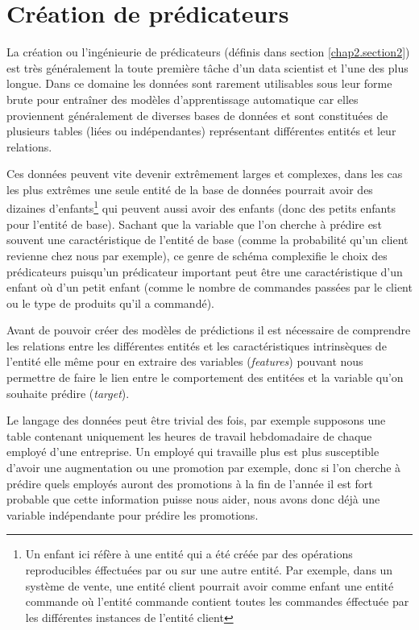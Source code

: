 \section{Création de prédicateurs}
\label{chap3.section1}
La création ou l'ingénieurie de prédicateurs (définis dans section \ref{chap2.section2}) est très généralement la toute première tâche d'un data scientist et l'une des plus longue. Dans ce domaine les données sont rarement utilisables sous leur forme brute pour entraîner des modèles d'apprentissage automatique car elles proviennent généralement de diverses bases de données et sont constituées de plusieurs tables (liées ou indépendantes) représentant différentes entités et leur relations. 

Ces données peuvent vite devenir extrêmement larges et complexes, dans les cas les plus
extrêmes une seule entité de la base de données pourrait avoir des dizaines d’enfants\footnote{Un enfant ici réfère à une entité qui a été créée par des opérations reproducibles éffectuées par ou sur une autre entité. Par exemple, dans un système de vente, une entité client pourrait avoir comme enfant une entité commande où l'entité commande contient toutes les commandes éffectuée par les différentes instances de l'entité client} qui
peuvent aussi avoir des enfants (donc des petits enfants pour l'entité de base). Sachant que la variable que l'on cherche à prédire est souvent une caractéristique de l'entité de base (comme la probabilité qu'un client revienne chez nous par exemple), ce genre de schéma complexifie le choix des prédicateurs puisqu'un prédicateur important peut être une caractéristique d'un enfant où d'un petit enfant (comme le nombre de commandes passées par le client ou le type de produits qu'il a commandé).

Avant de pouvoir créer des modèles de prédictions il est nécessaire de comprendre les
relations entre les différentes entités et les caractéristiques intrinsèques de l'entité elle
même pour en extraire des variables (\textit{features}) pouvant nous permettre de faire le lien entre le comportement des entitées et la variable qu’on souhaite prédire (\textit{target}).

Le langage des données peut être trivial des fois, par exemple supposons une table
contenant uniquement les heures de travail hebdomadaire de chaque employé d’une
entreprise. Un employé qui travaille plus est plus susceptible d’avoir une augmentation
ou une promotion par exemple, donc si l’on cherche à prédire quels employés auront des
promotions à la fin de l’année il est fort probable que cette information puisse nous aider,
nous avons donc déjà une variable indépendante pour prédire les promotions.

